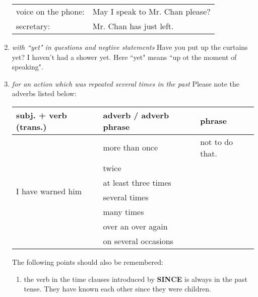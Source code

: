 \begin{enumerate}
\begin{tabular}{ll}
            voice on the phone: & May I speak to Mr. Chan please? \\
            secretary: & Mr. Chan has just left.
        \end{tabular}
    \item {\it with ``yet" in questions and negtive statements}
        \newline
        \newline
        Have you put up the curtains yet?
        \newline
        \newline
        I haven't had a shower yet.
        \newline
        \newline
        Here ``yet" means ``up ot the moment of speaking".
    \item {\it for an action which was repeated several times in the past}
        \newline
        \newline
        Please note the adverbs listed below:
        \newline
        \newline
        \begin{tabular}{|l|l|l|}
            \hline
            subj. + verb (trans.) & adverb / adverb phrase & phrase \\
            \hline
            \multirow{7}{*}{I have warned him}
            & more than once & not to do that. \\
            & twice & \\
            & at least three times & \\
            & several times & \\
            & many times & \\
            & over an over again & \\
            & on several occasions & \\ \hline
        \end{tabular}
        \newline
        \newline
        The following points should also be remembered:
        \begin{enumerate}
            \item the verb in the time clauses introduced by \textbf{SINCE} is
                always in the past tense.
                \newline
                \newline
                They have known each other since they were children.

\end{enumerate}
\end{enumerate}
